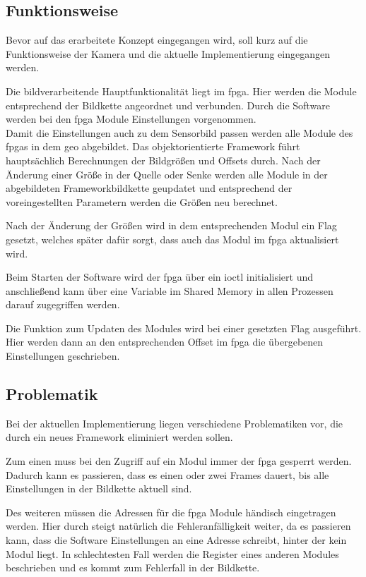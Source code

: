 \subsection{Funktionsweise}
Bevor auf das erarbeitete Konzept eingegangen wird, soll kurz auf die Funktionsweise der Kamera und die aktuelle Implementierung eingegangen werden.

Die bildverarbeitende Hauptfunktionalität liegt im \ac{fpga}. Hier werden die Module entsprechend der Bildkette angeordnet und verbunden. Durch die Software werden bei den \ac{fpga} Module Einstellungen vorgenommen.\\


Damit die Einstellungen auch zu dem Sensorbild passen werden alle Module des \ac{fpga}s in dem \ac{geo} abgebildet. Das objektorientierte Framework führt hauptsächlich Berechnungen der Bildgrößen und Offsets durch. Nach der Änderung einer Größe in der Quelle oder Senke werden alle Module in der abgebildeten Frameworkbildkette geupdatet und entsprechend der voreingestellten Parametern werden die Größen neu berechnet. 

Nach der Änderung der Größen wird in dem entsprechenden Modul ein Flag gesetzt, welches später dafür sorgt, dass auch das Modul im \ac{fpga} aktualisiert wird.

Beim Starten der Software wird der \ac{fpga} über ein \ac{ioctl} initialisiert und anschließend kann über eine Variable im Shared Memory in allen Prozessen darauf zugegriffen werden. 

Die Funktion zum Updaten des Modules wird bei einer gesetzten Flag ausgeführt. Hier werden dann an den entsprechenden Offset im \ac{fpga} die übergebenen Einstellungen geschrieben. 


\subsection{Problematik}\label{sec:prob}
Bei der aktuellen Implementierung liegen verschiedene Problematiken vor, die durch ein neues Framework eliminiert werden sollen.

Zum einen muss bei den Zugriff auf ein Modul immer der \ac{fpga} gesperrt werden. Dadurch kann es passieren, dass es einen oder zwei Frames dauert, bis alle Einstellungen in der Bildkette aktuell sind.


Des weiteren müssen die Adressen für die \ac{fpga} Module händisch eingetragen werden. Hier durch steigt natürlich die Fehleranfälligkeit weiter, da es passieren kann, dass die Software Einstellungen an eine Adresse schreibt, hinter der kein Modul liegt. In schlechtesten Fall werden die Register eines anderen Modules beschrieben und es kommt zum Fehlerfall in der Bildkette.


